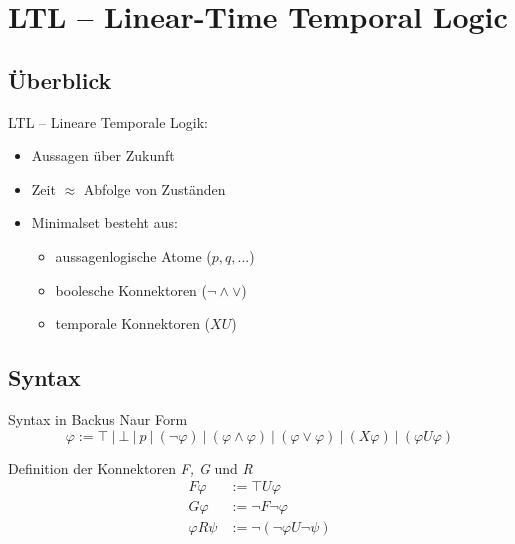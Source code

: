 \section{LTL -- Linear-Time Temporal Logic}

\subsection{Überblick}
\begin{frame}{\insertsubsection}
    LTL -- Lineare Temporale Logik:
    \vspace*{1em}
    \begin{itemize}
        \setlength\itemsep{1.5em}
        \item Aussagen über Zukunft
        \item Zeit $\approx$ Abfolge von Zuständen \cite{huth+04}
        \pause
        \item Minimalset besteht aus:
        \begin{itemize}
            \item aussagenlogische Atome ($p, q, ...$) 
            \item boolesche Konnektoren ($\lnot \land \lor$)
            \item temporale Konnektoren ($X U$)
        \end{itemize}
    \end{itemize}
\end{frame}

\subsection{Syntax}
\begin{frame}{\insertsubsection}
    \begin{block}{Syntax in Backus Naur Form}
        \vspace*{-1em}
        \begin{equation*}
        \label{ltl:syntax_basics}
            \varphi := \top\ |\ \bot\ |\ p\ |\ (\lnot\varphi)\ |\ (\varphi \land \varphi)\ |\ (\varphi \lor \varphi)\ |\ (X\varphi)\ |\ (\varphi U\varphi)
        \end{equation*}
    \end{block}
    \vspace*{1em}
    \pause
    \begin{block}{Definition der Konnektoren \textit{F, G} und \textit{R}}
        \vspace*{-1em}
        \begin{equation*}
        \label{ltl:syntax_details}
        \begin{split}
            F\varphi &:= \top U\varphi\\
            G\varphi &:= \lnot F\lnot\varphi\\
            \varphi R\psi &:= \lnot(\lnot\varphi U\lnot\psi)\\
        \end{split}
        \end{equation*}
    \end{block}
\end{frame}

